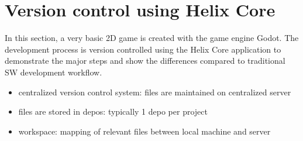 \section{Version control using Helix Core\textsuperscript{\texttrademark}}
In this section, a very basic 2D game is created with the game engine Godot. The development process is version 
controlled using the Helix Core application to demonstrate the major steps and show the differences compared to 
traditional SW development workflow.
\begin{itemize}
    \item centralized version control system: files are maintained on centralized server
    \item files are stored in depos: typically 1 depo per project
    \item workspace: mapping of relevant files between local machine and server
\end{itemize}

